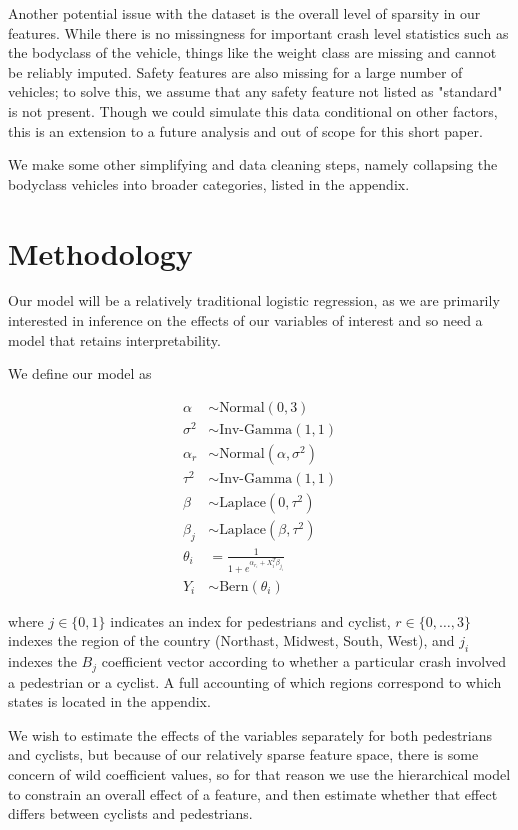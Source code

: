 \documentclass[12pt]{article}
\begin{document}
Another potential issue with the dataset is the overall level of sparsity in our features. While there is no 
missingness for important crash level statistics such as the bodyclass of the vehicle, things like the weight class
are missing and cannot be reliably imputed. Safety features are also missing for a large number of vehicles; to solve
this, we assume that any safety feature not listed as "standard" is not present. Though we could simulate this data 
conditional on other factors, this is an extension to a future analysis and out of scope for this short paper.

We make some other simplifying and data cleaning steps, namely collapsing the bodyclass vehicles into broader categories,
listed in the appendix.

\section{Methodology}

Our model will be a relatively traditional logistic regression, as we are primarily interested in inference on the 
effects of our variables of interest and so need a model that retains interpretability. 

We define our model as 

\begin{align*}
\alpha &\sim \text{Normal}(0, 3) \\
\sigma^2 &\sim \text{Inv-Gamma}(1, 1) \\
\alpha_{r} &\sim \text{Normal}(\alpha, \sigma^2) \\
\tau^2 &\sim \text{Inv-Gamma}(1, 1) \\
\beta &\sim \text{Laplace}(0, \tau^2) \\
\beta_{j} & \sim \text{Laplace}(\beta, \tau^2) \\
\theta_i &= \frac{1}{1 + e^{\alpha_{r_i} + X_i^T \beta_{j_i}}} \\
Y_i &\sim \text{Bern}(\theta_i) 
\end{align*}

where $j \in \{0, 1\}$ indicates an index for pedestrians and cyclist, $r \in \{0, \dots, 3\}$ indexes the region
of the country (Northast, Midwest, South, West), and $j_i$ indexes the $B_j$ coefficient vector according to whether a
particular crash involved a pedestrian or a cyclist. A full accounting of which regions correspond to which states is 
located in the appendix.

We wish to estimate the effects of the variables separately for both pedestrians and cyclists, but because of our 
relatively sparse feature space, there is some concern of wild coefficient values, so for that reason we use the 
hierarchical model to constrain an overall effect of a feature, and then estimate whether that effect differs
between cyclists and pedestrians. 
\end{document}
